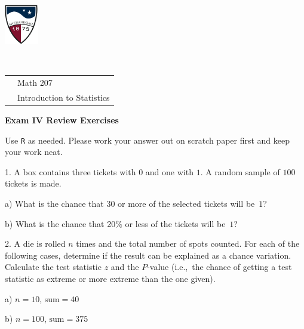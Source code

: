 \documentclass[10pt]{article}
\begin{document}
\pagestyle{empty}
\lstset{language=R, showspaces=false, showstringspaces=false}
\href{http://www.su.edu}{\includegraphics[height=1.75cm]{sulogo.eps}}
\vspace{-1.79cm}

{{\ }\hfill\small
\begin{tabular}{cl}
& Math 207\\
& Introduction to Statistics\\
\end{tabular}
}

\setlength{\baselineskip}{1.05\baselineskip}
\medskip

\begin{center}
\textbf{\large  Exam IV Review Exercises}
\end{center}
Use \texttt{R} as needed.  Please work your answer out on scratch
paper first and keep your work neat.
\smallskip


\newcommand{\HH}{\hspace{20pt}\hphantom{a) } }

1. A box contains three tickets with $0$ and one with $1$.  
A random sample of $100$ tickets is made.  

\hspace{10pt} a) What is the chance that 30 or more of the selected
tickets will be~$1$?
\vspace{1in}

\hspace{10pt} b) What is the chance that 20\% or less of the tickets will be~$1$?
\vspace{1in}

2. A die is rolled $n$ times and the total number of spots counted.
For each of the following cases, determine if the result can be explained as a chance
variation.  Calculate the test statistic $z$ and the $P$-value
(i.e.,~the chance of getting a test statistic 
  as extreme or more extreme than the one given).

\hspace{10pt} a) $n=10$, $\mbox{sum}=40$
\vspace{1.75in}

\hspace{10pt} b) $n=100$, $\mbox{sum}=375$
\vspace{1.5in}
\end{document}
